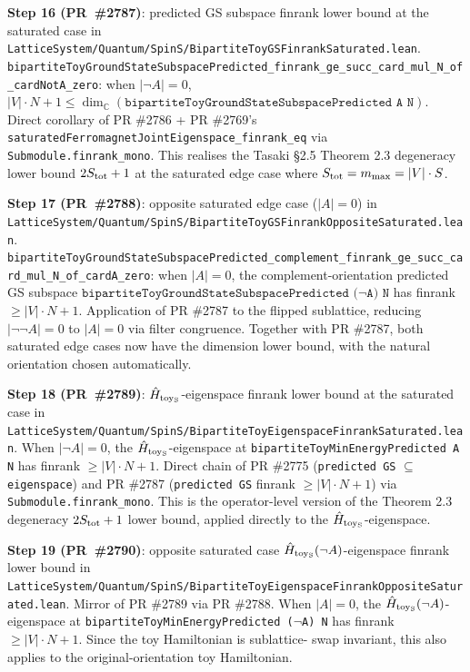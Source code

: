 \documentclass[a4paper,11pt]{article}
\begin{document}
\textbf{Step 16 (PR~\#2787)}: predicted GS subspace finrank lower
bound at the saturated case in
\texttt{LatticeSystem/Quantum/SpinS/BipartiteToyGSFinrankSaturated.lean}.
\texttt{bipartiteToyGroundStateSubspacePredicted\_finrank\_ge\_succ\_card\_mul\_N\_of\_cardNotA\_zero}:
when $|\neg A| = 0$,
$|V|\cdot N + 1 \le
\dim_\mathbb{C}(\texttt{bipartiteToyGroundStateSubspacePredicted A N})$.
Direct corollary of PR \#2786 + PR \#2769's
\texttt{saturatedFerromagnetJointEigenspace\_finrank\_eq} via
\texttt{Submodule.finrank\_mono}. This realises the Tasaki §2.5
Theorem 2.3 degeneracy lower bound $2 S_{\rm tot} + 1$ at the
saturated edge case where $S_{\rm tot} = m_{\max} = |V|\cdot S$.

\textbf{Step 17 (PR~\#2788)}: opposite saturated edge case
($|A| = 0$) in
\texttt{LatticeSystem/Quantum/SpinS/BipartiteToyGSFinrankOppositeSaturated.lean}.
\texttt{bipartiteToyGroundStateSubspacePredicted\_complement\_finrank\_ge\_succ\_card\_mul\_N\_of\_cardA\_zero}:
when $|A| = 0$, the complement-orientation predicted GS subspace
$\texttt{bipartiteToyGroundStateSubspacePredicted ($\neg$A) N}$
has finrank $\ge |V|\cdot N + 1$. Application of PR \#2787 to the
flipped sublattice, reducing $|\neg\neg A| = 0$ to $|A| = 0$ via
filter congruence. Together with PR \#2787, both saturated edge
cases now have the dimension lower bound, with the natural
orientation chosen automatically.

\textbf{Step 18 (PR~\#2789)}: $\hat H_{\rm toy_S}$-eigenspace
finrank lower bound at the saturated case in
\texttt{LatticeSystem/Quantum/SpinS/BipartiteToyEigenspaceFinrankSaturated.lean}.
When $|\neg A| = 0$, the $\hat H_{\rm toy_S}$-eigenspace at
\texttt{bipartiteToyMinEnergyPredicted A N} has finrank
$\ge |V|\cdot N + 1$. Direct chain of PR \#2775
(\texttt{predicted GS} $\subseteq$ \texttt{eigenspace}) and
PR \#2787 (\texttt{predicted GS} finrank $\ge |V|\cdot N + 1$)
via \texttt{Submodule.finrank\_mono}. This is the operator-level
version of the Theorem 2.3 degeneracy $2 S_{\rm tot} + 1$ lower
bound, applied directly to the $\hat H_{\rm toy_S}$-eigenspace.

\textbf{Step 19 (PR~\#2790)}: opposite saturated case
$\hat H_{\rm toy_S}(\neg A)$-eigenspace finrank lower bound in
\texttt{LatticeSystem/Quantum/SpinS/BipartiteToyEigenspaceFinrankOppositeSaturated.lean}.
Mirror of PR \#2789 via PR \#2788. When $|A| = 0$, the
$\hat H_{\rm toy_S}(\neg A)$-eigenspace at
\texttt{bipartiteToyMinEnergyPredicted ($\neg$A) N} has finrank
$\ge |V|\cdot N + 1$. Since the toy Hamiltonian is sublattice-
swap invariant, this also applies to the original-orientation
toy Hamiltonian.
\end{document}
